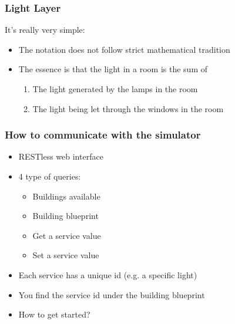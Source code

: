 \documentclass[t]{beamer}
\begin{document}
\begin{frame}
  \frametitle{Light Layer}
  
  It's really very simple:
  \begin{center}
  \end{center}
  \begin{itemize}
    \pause
    \item The notation does not follow strict mathematical tradition
    \pause
    \item The essence is that the light in a room is the sum of
    \begin{enumerate}
      \item The light generated by the lamps in the room
      \item The light being let through the windows in the room
    \end{enumerate}
  \end{itemize}
  
\end{frame}

\begin{frame}
  \frametitle{How to communicate with the simulator}
  
  \begin{itemize}
    \item RESTless web interface
    \item 4 type of queries:
    \begin{itemize}
          \item Buildings available
          \item Building blueprint
          \item Get a service value
          \item Set a service value
    \end{itemize}
    \item Each service has a unique id (e.g. a specific light)
    \item You find the service id under the building blueprint
    \item How to get started? 

 \end{itemize}
  
\end{frame}
\end{document}
